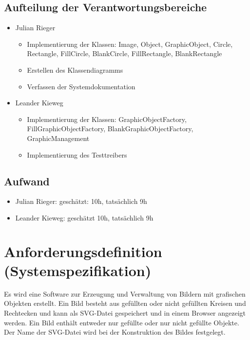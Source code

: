 \documentclass[a4paper,12pt]{article}
\begin{document}
\subsection{Aufteilung der Verantwortungsbereiche}
\begin{itemize}
\item Julian Rieger
    \begin{itemize}
        \item Implementierung der Klassen: Image, Object, GraphicObject, Circle, Rectangle, FillCircle, BlankCircle, FillRectangle, BlankRectangle
        \item Erstellen des Klassendiagramms
        \item Verfassen der Systemdokumentation
    \end{itemize}
\item Leander Kieweg
    \begin{itemize}
        \item Implementierung der Klassen: GraphicObjectFactory, FillGraphicObjectFactory, BlankGraphicObjectFactory, GraphicManagement
        \item Implementierung des Testtreibers

    \end{itemize}
\end{itemize}

\subsection{Aufwand}
\begin{itemize}
\item Julian Rieger: geschätzt: 10h, tatsächlich 9h
\item Leander Kieweg: geschätzt 10h, tatsächlich 9h
\end{itemize}

\newpage
\section{Anforderungsdefinition (Systemspezifikation)}
Es wird eine Software zur Erzeugung und Verwaltung von Bildern mit grafischen Objekten erstellt. Ein Bild besteht aus gefüllten oder nicht gefüllten Kreisen und Rechtecken und kann als SVG-Datei gespeichert und in einem Browser angezeigt werden. Ein Bild enthält entweder nur gefüllte oder nur nicht gefüllte Objekte. Der Name der SVG-Datei wird bei der Konstruktion des Bildes festgelegt.
\end{document}
